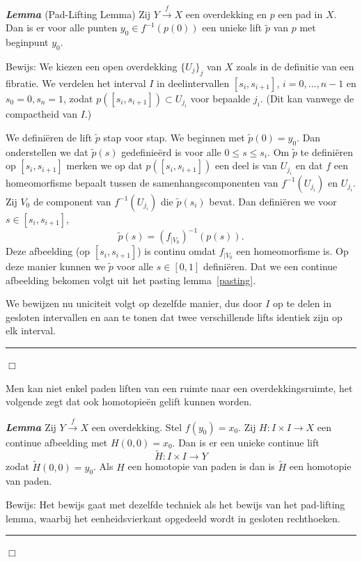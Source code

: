 \documentclass[12pt]{book}
\newcommand{\bew}{{\sc Bewijs: }}
\newcommand{\B}{\rule{1mm}{0mm} \hfill $\Box$ }
\newenvironment{lem}{\begin{lemh}{\em {\bf Lemma }}}{\end{lemh}}
\begin{document}
\begin{lem} {\rm (Pad-Lifting Lemma)}
Zij $Y\stackrel{f}{\to} X$ een overdekking en $p$ een pad in  $X$. Dan is er voor alle punten $y_0\in f^{-1}(p(0))$ een unieke lift $\widetilde{p}$ van $p$ met beginpunt $y_0$.
\end{lem}

\bew We kiezen een open overdekking $\{U_j\}_{j}$ van $X$ zoals in de definitie van een fibratie. 
We verdelen het interval $I$ in deelintervallen $[s_i, s_{i+1}]$, $i=0, \ldots, n-1$ en $s_0=0, s_n=1$, zodat 
$p([s_i, s_{i+1}])\subset U_{j_{i}}$ voor bepaalde $j_i$. (Dit kan vanwege de compactheid van $I$.)

We defini\"eren de lift $\widetilde{p}$ stap voor stap. We beginnen met $\widetilde{p}(0)=y_0$. Dan onderstellen we dat
$\widetilde{p}(s)$ gedefinie\"erd is voor alle $0\leq s\leq s_i$. Om $\widetilde{p}$ te defini\"eren op $[s_{i}, s_{i+1}]$ merken we op dat $p([s_i, s_{i+1}])$ een deel is van $U_{j_i}$ en dat $f$ een homeomorfisme bepaalt tussen de 
samenhangscomponenten van $f^{-1}(U_{j_{i}})$ en $U_{j_{i}}$. Zij $V_{0}$  de component van $f^{-1}(U_{j_{i}})$
die $\widetilde{p}(s_i)$ bevat. Dan defini\"eren we  voor $s\in [s_i, s_{i+1}]$,
$$\widetilde{p}(s)=(f_{|V_{0}})^{-1}(p(s)).$$
Deze afbeelding (op $[s_i, s_{i+1}]$) is continu omdat $f_{|V_{0}}$ een homeomorfisme is. Op deze manier kunnen we 
$\widetilde{p}$ voor alle $s\in [0,1]$ defini\"eren. Dat we een continue afbeelding bekomen volgt uit het pasting lemma~\ref{pasting}.

We bewijzen nu uniciteit volgt op dezelfde manier, dus door $I$ op te delen in gesloten intervallen en aan te tonen dat twee verschillende lifts identiek zijn op elk interval. \B

Men kan niet enkel paden liften van een ruimte naar een overdekkingsruimte, het volgende zegt dat ook homotopie\"en gelift kunnen worden. 

\begin{lem}
Zij $Y\stackrel{f}{\to} X$ een overdekking. Stel $f(y_0)=x_0$.
Zij $H:I\times I \to X$ een continue afbeelding met $H(0,0)=x_0$. Dan is er een unieke continue lift
$$\widetilde{H}:I\times I\to Y$$
zodat $\widetilde{H}(0,0)= y_{0}$. Als $H$ een homotopie van paden is dan is $\widetilde{H}$ een homotopie van paden.
\label{homotoplift}
\end{lem}

\bew Het bewijs gaat met dezelfde techniek als het bewijs van het pad-lifting lemma, waarbij het eenheidsvierkant opgedeeld wordt in gesloten rechthoeken. \B
\end{document}
